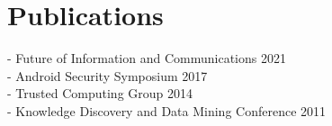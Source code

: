 \documentclass[]{deedy-resume-openfont}
\begin{document}
%
%
\section{Publications}
\raggedright

- Future of Information and Communications 2021\\
- Android Security Symposium 2017\\
- Trusted Computing Group 2014\\
- Knowledge Discovery and Data Mining Conference 2011\\
\sectionsep

\ 
\end{document}
